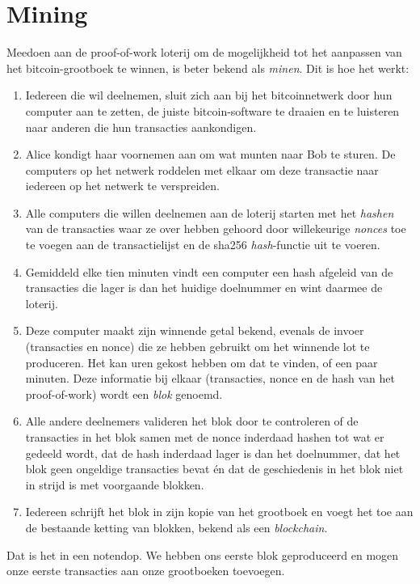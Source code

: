
\chapter{Mining}

Meedoen aan de proof-of-work loterij om de mogelijkheid tot het aanpassen van het bitcoin-grootboek te winnen, is beter bekend als \textit{minen}. Dit is hoe het werkt:

\begin{enumerate}
    \item Iedereen die wil deelnemen, sluit zich aan bij het bitcoinnetwerk door hun computer aan te zetten, de juiste bitcoin-software te draaien en te luisteren naar anderen die hun transacties aankondigen.
    \item Alice kondigt haar voornemen aan om wat munten naar Bob te sturen. De computers op het netwerk \textquotedbl{}roddelen\textquotedbl{} met elkaar om deze transactie naar iedereen op het netwerk te verspreiden.
    \item Alle computers die willen deelnemen aan de loterij starten met het \textit{hashen} van de transacties waar ze over hebben gehoord door willekeurige \textit{nonces} toe te voegen aan de transactielijst en de sha256 \textit{hash}-functie uit te voeren.
    \item Gemiddeld elke tien minuten vindt een computer een hash afgeleid van de transacties die lager is dan het huidige doelnummer en wint daarmee de loterij.
    \item Deze computer maakt zijn winnende getal bekend, evenals de invoer (transacties en nonce) die ze hebben gebruikt om het winnende lot te produceren. Het kan uren gekost hebben om dat te vinden, of een paar minuten. Deze informatie bij elkaar (transacties, nonce en de hash van het proof-of-work) wordt een \textit{blok} genoemd.
    \item Alle andere deelnemers valideren het blok door te controleren of de transacties in het blok samen met de nonce inderdaad hashen tot wat er gedeeld wordt, dat de hash inderdaad lager is dan het doelnummer, dat het blok geen ongeldige transacties bevat én dat de geschiedenis in het blok niet in strijd is met voorgaande blokken.
    \item Iedereen schrijft het blok in zijn kopie van het grootboek en voegt het toe aan de bestaande ketting van blokken, bekend als een \textit{blockchain}.
\end{enumerate}

Dat is het in een notendop. We hebben ons eerste blok geproduceerd en mogen onze eerste transacties aan onze grootboeken toevoegen.

